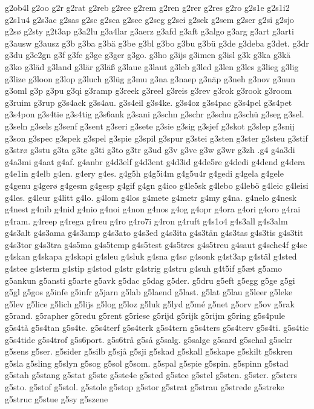 g2ob4l
g2oo
g2r
g2rat
g2reb
g2ree
g2rem
g2ren
g2rer
g2res
g2ro
g2s1e
g2s1i2
g2s1u4
g2s3ac
g2sas
g2sc
g2sca
g2sce
g2seg
g2sei
g2sek
g2sem
g2ser
g2si
g2sjo
g2sø
g2sty
g2t3ap
g3a2lu
g3a4lar
g3aerz
g3afd
g3aft
g3algo
g3arg
g3art
g3arti
g3ausw
g3ausz
g3b
g3ba
g3bä
g3be
g3bl
g3bo
g3bu
g3bü
g3de
g3deba
g3det.
g3dr
g3du
g3e2gn
g3f
g3fe
g3ge
g3ger
g3go.
g3ho
g3ijs
g3imen
g3isl
g3k
g3ka
g3kä
g3ko
g3läd
g3land
g3lär
g3läß
g3laue
g3laut
g3leb
g3led
g3len
g3les
g3lieg
g3lig
g3lize
g3loon
g3lop
g3luch
g3lüg
g3mu
g3na
g3naep
g3näp
g3neh
g3nov
g3nun
g3oml
g3p
g3pu
g3qi
g3ramp
g3reek
g3reel
g3reis
g3rev
g3rok
g3rook
g3room
g3ruim
g3rup
g3s4ack
g3s4au.
g3s4eil
g3s4ke.
g3s4oz
g3s4pac
g3s4pel
g3s4pet
g3s4pon
g3s4tie
g3s4tig
g3s6ank
g3sani
g3schn
g3schr
g3schu
g3schü
g3seg
g3sel.
g3seln
g3sels
g3senf
g3sent
g3seri
g3sete
g3sie
g3sig
g3sjef
g3skot
g3slep
g3snij
g3son
g3spec
g3spek
g3spel
g3spie
g3spil
g3spur
g3stei
g3sten
g3ster
g3steu
g3stif
g3strø
g3stu
g3ta
g3te
g3ti
g3to
g3tr
g3ud
g3v
g3ve
g3w
g3wr
g3zh
.g4
g4a3di
g4a3mi
g4aat
g4af.
g4anbr
g4d3elf
g4d3ent
g4d3id
g4de5re
g4dedi
g4dend
g4dera
g4e1in
g4elb
g4en.
g4ery
g4es.
g4g5h
g4g5i4m
g4g5u4r
g4gedi
g4gela
g4gele
g4genu
g4gerø
g4gesm
g4gesp
g4gif
g4gn
g4ico
g4le5sk
g4lebo
g4lebö
g4leic
g4leisi
g4les.
g4leur
g4litt
g4lo.
g4lom
g4los
g4mete
g4metr
g4my
g4na.
g4nelo
g4nesk
g4nest
g4nib
g4nid
g4nio
g4noi
g4non
g4nos
g4og
g4opr
g4ora
g4ori
g4oro
g4rai
g4ram.
g4reep
g4rega
g4reu
g4ro
g4ro7i
g4ron
g4ruft
g4s1o4
g4s3all
g4s3alm
g4s3alt
g4s3ama
g4s3amp
g4s3ato
g4s3ed
g4s3ita
g4s3tän
g4s3tas
g4s3tis
g4s3tit
g4s3tor
g4s3tra
g4s5ma
g4s5temp
g4s5test
g4s5tres
g4s5treu
g4saut
g4sche4f
g4se
g4skan
g4skapa
g4skapi
g4sleu
g4sluk
g4sna
g4sø
g4sonk
g4st3ap
g4stäl
g4sted
g4stee
g4sterm
g4stip
g4stod
g4str
g4strig
g4stru
g4suh
g4t5if
g5æt
g5amo
g5ankun
g5ansti
g5arte
g5avk
g5dac
g5dag
g5der.
g5dru
g5eft
g5egg
g5ge
g5gi
g5gl
g5gos
g5infe
g5infr
g5jarn
g5lab
g5laend
g5last.
g5lat
g5lau
g5leer
g5leke
g5lev
g5lice
g5lich
g5lijs
g5log
g5loz
g5luk
g5lyd
g5mé
g5net
g5orv
g5ov
g5rak
g5rand.
g5rapher
g5redu
g5rent
g5riese
g5rijd
g5rijk
g5rijm
g5ring
g5s4pule
g5s4tå
g5s4tan
g5s4te.
g5s4terf
g5s4terk
g5s4tern
g5s4ters
g5s4terv
g5s4ti.
g5s4tic
g5s4tide
g5s4trof
g5s6port.
g5s6trå
g5så
g5salg.
g5salge
g5sard
g5schal
g5sekr
g5sens
g5ser.
g5sider
g5silb
g5sjå
g5sji
g5skad
g5skall
g5skape
g5skilt
g5skren
g5sla
g5sling
g5slyn
g5sog
g5sol
g5som.
g5spal
g5spie
g5spin.
g5spinn
g5stad
g5stah
g5stang
g5stat
g5ste
g5ste4e
g5sted
g5stee
g5stel
g5sten.
g5ster.
g5sters
g5sto.
g5stof
g5stol.
g5stole
g5stop
g5stor
g5strat
g5strau
g5strede
g5streke
g5struc
g5stue
g5sy
g5szene
